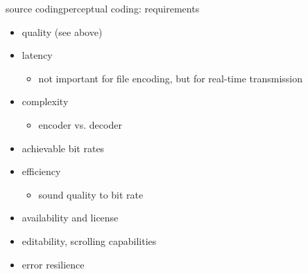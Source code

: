 	\begin{frame}{source coding}{perceptual coding: requirements}
        \begin{itemize}
            \item   quality (see above)
            \item	latency
                \begin{itemize}
                    \item   not important for file encoding, but for real-time transmission
                \end{itemize}
            \item	complexity
                \begin{itemize}
                    \item   encoder vs. decoder
                \end{itemize}
            \item   achievable bit rates
            \item   efficiency
                \begin{itemize}
                    \item   sound quality to bit rate
                \end{itemize}
            \item	availability and license
            \item   editability, scrolling capabilities
            \item   error resilience
		\end{itemize}
\end{frame}

